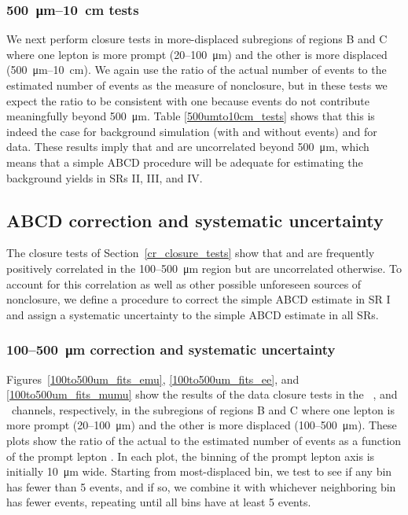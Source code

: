 

\subsubsection{\SI{500}{\um}--\SI{10}{\cm} tests}
We next perform closure tests in more-displaced subregions of regions B and C where one lepton is more prompt (\num{20}--\SI{100}{\um}) and the other is more displaced (\SI{500}{\um}--\SI{10}{\cm}). We again use the ratio of the actual number of events to the estimated number of events as the measure of nonclosure, but in these tests we expect the ratio to be consistent with one because \ztautaull events do not contribute meaningfully beyond \SI{500}{\um}. Table \ref{500umto10cm_tests} shows that this is indeed the case for background simulation (with and without \ztautaull events) and for data. These results imply that \ada and \adb are uncorrelated beyond \SI{500}{\um}, which means that a simple ABCD procedure will be adequate for estimating the background yields in SRs II, III, and IV.



\subsection{ABCD correction and systematic uncertainty}
\label{abcd_correction}
The closure tests of Section~\ref{cr_closure_tests} show that \ada and \adb are frequently positively correlated in the \num{100}--\SI{500}{\um} region but are uncorrelated otherwise. To account for this correlation as well as other possible unforeseen sources of nonclosure, we define a procedure to correct the simple ABCD estimate in SR I and assign a systematic uncertainty to the simple ABCD estimate in all SRs.

\subsubsection{\num{100}--\SI{500}{\um} correction and systematic uncertainty}
Figures~\ref{100to500um_fits_emu}, \ref{100to500um_fits_ee}, and \ref{100to500um_fits_mumu} show the results of the data closure tests in the \Pe\Pgm\, \Pe\Pe, and \Pgm\Pgm\ channels, respectively, in the subregions of regions B and C where one lepton is more prompt (\num{20}--\SI{100}{\um}) and the other is more displaced (\num{100}--\SI{500}{\um}). These plots show the ratio of the actual to the estimated number of events as a function of the prompt lepton \ad. In each plot, the binning of the prompt lepton axis is initially \SI{10}{\um} wide. Starting from most-displaced bin, we test to see if any bin has fewer than 5 events, and if so, we combine it with whichever neighboring bin has fewer events, repeating until all bins have at least 5 events.


